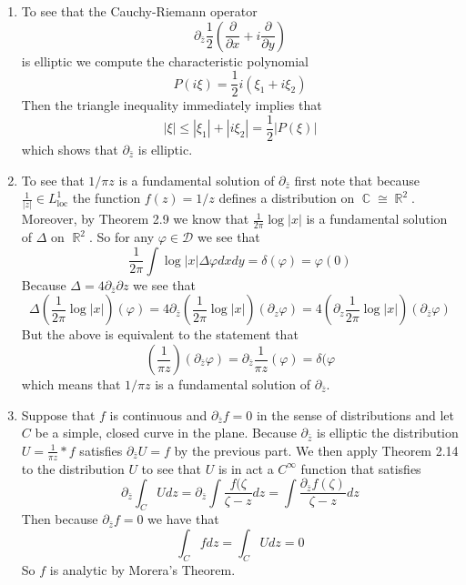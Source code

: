 \documentclass{article}
\DeclareMathOperator{\R}{\mathbb{R}}
\DeclareMathOperator{\C}{\mathbb{C}}
\newcommand{\exercise}[1]{\noindent{\textbf{Exercise #1:}}}
\newcommand{\der}[2]{\frac{\partial #1}{\partial #2}}
\begin{document}
\exercise{3.4.16}
\begin{enumerate}
\item To see that the Cauchy-Riemann operator
  \[
  \partial_{\bar{z}}\frac{1}{2}\left(\der{}{x} + i\der{}{y}\right)
  \]
  is elliptic we compute the characteristic polynomial
  \[
  P(i\xi) = \frac{1}{2}i\left(\xi_1 + i\xi_2\right)
  \]
  Then the triangle inequality immediately implies that
  \[
  |\xi| \leq |\xi_1| + |i\xi_2| = \frac{1}{2}|P(\xi)|
  \]
  which shows that $\partial_{\bar{z}}$ is elliptic.
\item To see that $1/\pi z$ is a fundamental solution of
  $\partial_{\bar{z}}$ first note that because $\frac{1}{|z|} \in
  L^1_{\text{loc}}$ the function $f(z) = 1/z$ defines a distribution
  on $\C \cong \R^2$. Moreover, by Theorem 2.9 we know that
  $\frac{1}{2\pi}\log|x|$ is a fundamental solution of $\Delta$ on
  $\R^2$. So for any $\varphi \in \mathcal{D}$ we see that
  \[
  \frac{1}{2\pi}\int \log|x|\Delta\varphi dxdy = \delta(\varphi) = \varphi(0)
  \]
  Because $\Delta = 4\partial_{\bar{z}}\partial{z}$ we see that
  \[
  \Delta (\frac{1}{2\pi}\log|x|)(\varphi) = 4\partial_{\bar{z}}
  (\frac{1}{2\pi}\log|x|)(\partial_{z}\varphi) = 4
  (\partial_{z}\frac{1}{2\pi}\log|x|)(\partial_{\bar{z}}\varphi)
  \]
  But the above is equivalent to the statement that
  \[
  (\frac{1}{\pi z})(\partial_{\bar{z}}\varphi) = \partial_{\bar{z}}
  \frac{1}{\pi z}(\varphi) = \delta(\varphi
  \]
  which means that $1/\pi z$ is a fundamental solution of
  $\partial_{\bar{z}}$.
\item Suppose that $f$ is continuous and $\partial_{\bar{z}}f = 0$ in
  the sense of distributions and let $C$ be a simple, closed curve in
  the plane. Because $\partial_{\bar{z}}$ is elliptic the
  distribution $U = \frac{1}{\pi z}\ast f$ satisfies
  $\partial_{\bar{z}} U = f$ by the previous part. We then apply
  Theorem 2.14 to the distribution $U$ to see that $U$ is in act a
  $C^{\infty}$ function that satisfies
  \[
  \partial_{\bar{z}}\int_C Udz = \partial_{\bar{z}}\int
  \frac{f(\zeta}{\zeta -z}dz = \int
  \frac{\partial_{\bar{z}}f(\zeta)}{\zeta -z}dz
  \]
  Then because $\partial_{\bar{z}} f = 0$ we have that
  \[
  \int_C fdz = \int_C Udz = 0
  \]
  So $f$ is analytic by Morera's Theorem. 
\end{enumerate}
\end{document}

